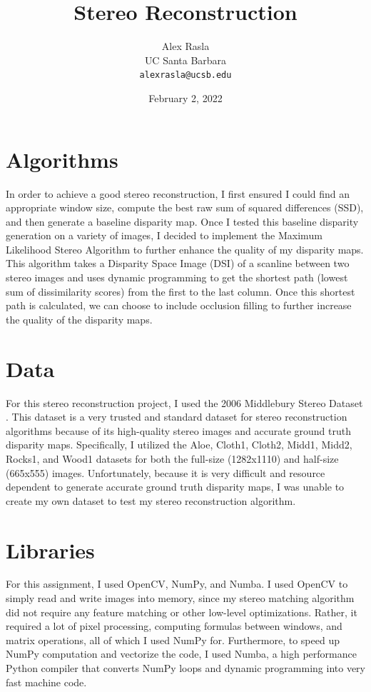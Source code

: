 \documentclass[11pt,a4paper]{article}
\title{Stereo Reconstruction}
\author{Alex Rasla \\
  UC Santa Barbara \\
  \texttt{alexrasla@ucsb.edu}}
\date{February 2, 2022}
\begin{document}
\maketitle

\section{Algorithms}

In order to achieve a good stereo reconstruction, I first ensured I could find an appropriate 
 window size, compute the best raw sum of squared differences (SSD), and then generate a baseline disparity map. 
 Once I tested this baseline disparity generation on a variety of images, I decided to implement the Maximum Likelihood Stereo 
 Algorithm \cite{COX1996542} to further enhance the quality of my disparity maps. This algorithm takes a Disparity Space Image (DSI) of a scanline between two stereo images and 
 uses dynamic programming to get the shortest path (lowest sum of dissimilarity scores) from the first to the last column. 
 Once this shortest path is calculated, we can choose to include occlusion filling to further increase the quality of the disparity maps.

\section{Data}

For this stereo reconstruction project, I used the 2006 Middlebury Stereo Dataset \cite{Hirschmller2007EvaluationOC}. 
 This dataset is a very trusted and standard dataset for stereo reconstruction algorithms because of its high-quality stereo 
 images and accurate ground truth disparity maps. Specifically, I utilized the Aloe, Cloth1, Cloth2, Midd1, Midd2, Rocks1, and Wood1 datasets for 
 both the full-size (1282x1110) and half-size (665x555) images.  Unfortunately, because it is very difficult and resource 
 dependent to generate accurate ground truth disparity maps, I was unable to create my own dataset to test my stereo reconstruction 
 algorithm.

\section{Libraries}

For this assignment, I used OpenCV, NumPy, and Numba. I used OpenCV to simply read and write images into memory, 
 since my stereo matching algorithm did not require any feature matching or other low-level optimizations. Rather, 
 it required a lot of pixel processing, computing formulas between windows, and matrix operations, all of which I used NumPy for.
 Furthermore, to speed up NumPy computation and vectorize the code, I used Numba, a high performance Python compiler that converts 
 NumPy loops and dynamic programming into very fast machine code.
\end{document}
